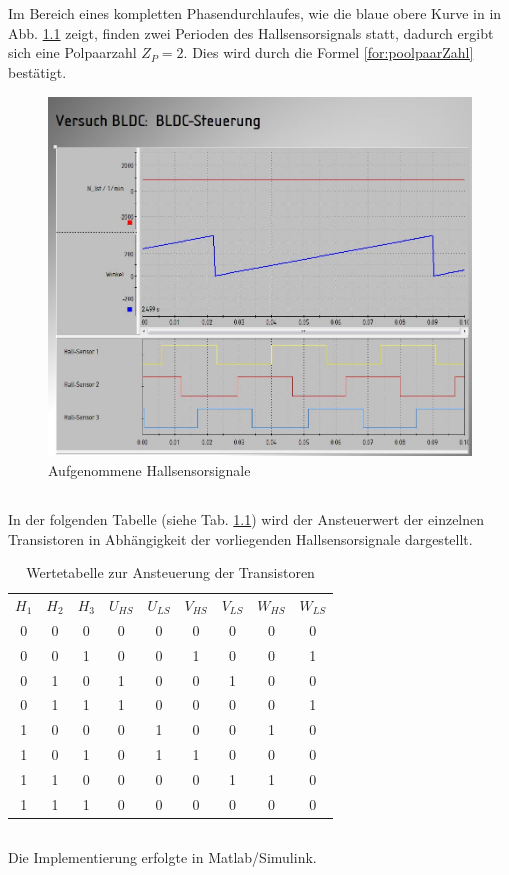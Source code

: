 \chapter{}\label{ex:aufg4}
%
\section{}\label{sec:aufg4a}
Im Bereich eines kompletten Phasendurchlaufes, wie die blaue obere Kurve in in Abb. \ref{fig:aufgenommen_hallSensorSig} zeigt, finden zwei Perioden des Hallsensorsignals statt, dadurch ergibt sich eine Polpaarzahl $Z_P = 2$. Dies wird durch die Formel \ref{for:poolpaarZahl} best\"atigt.
\begin{figure}[htb]
	\includegraphics[width = \textwidth]{./Bilder/bldc_aufgenommenSig}
	\caption{Aufgenommene Hallsensorsignale}
	\label{fig:aufgenommen_hallSensorSig}
\end{figure}
\newpage
\section{}\label{sec:aufg4b}
In der folgenden Tabelle (siehe Tab. \ref{tab:T_Ansteuerung}) wird der Ansteuerwert der einzelnen Transistoren in Abhängigkeit der vorliegenden Hallsensorsignale dargestellt.

\begin{table}[htb]
	\centering
\begin{tabular}{ccc||cccccc}
	$H_1$ & $H_2$ & $H_3$ & $U_{HS}$ & $U_{LS}$ & $V_{HS}$ & $V_{LS}$ & $W_{HS}$ & $W_{LS}$ \\ 
	0&0&0&0&0&0&0&0&0\\
	0&0&1&0&0&1&0&0&1\\
	0&1&0&1&0&0&1&0&0\\
	0&1&1&1&0&0&0&0&1\\
	1&0&0&0&1&0&0&1&0\\
	1&0&1&0&1&1&0&0&0\\
	1&1&0&0&0&0&1&1&0\\
	1&1&1&0&0&0&0&0&0
\end{tabular}  
\caption{Wertetabelle zur Ansteuerung der Transistoren}
\label{tab:T_Ansteuerung}
\end{table}
%
\section{}\label{sec:aufg4c}
%
Die Implementierung erfolgte in Matlab/Simulink.